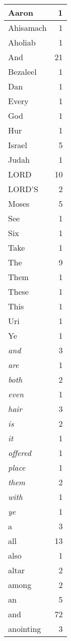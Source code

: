 \begin{center}
\begin{longtable}{l|r}
\hline \hline
\endlastfoot
Aaron & 1 \\ \hline
Ahisamach & 1 \\ \hline
Aholiab & 1 \\ \hline
And & 21 \\ \hline
Bezaleel & 1 \\ \hline
Dan & 1 \\ \hline
Every & 1 \\ \hline
God & 1 \\ \hline
Hur & 1 \\ \hline
Israel & 5 \\ \hline
Judah & 1 \\ \hline
LORD & 10 \\ \hline
LORD'S & 2 \\ \hline
Moses & 5 \\ \hline
See & 1 \\ \hline
Six & 1 \\ \hline
Take & 1 \\ \hline
The & 9 \\ \hline
Them & 1 \\ \hline
These & 1 \\ \hline
This & 1 \\ \hline
Uri & 1 \\ \hline
Ye & 1 \\ \hline
\emph{and} & 3 \\ \hline
\emph{are} & 1 \\ \hline
\emph{both} & 2 \\ \hline
\emph{even} & 1 \\ \hline
\emph{hair} & 3 \\ \hline
\emph{is} & 2 \\ \hline
\emph{it} & 1 \\ \hline
\emph{offered} & 1 \\ \hline
\emph{place} & 1 \\ \hline
\emph{them} & 2 \\ \hline
\emph{with} & 1 \\ \hline
\emph{ye} & 1 \\ \hline
a & 3 \\ \hline
all & 13 \\ \hline
also & 1 \\ \hline
altar & 2 \\ \hline
among & 2 \\ \hline
an & 5 \\ \hline
and & 72 \\ \hline
anointing & 3 \\ \hline

\end{longtable}
\end{center}
